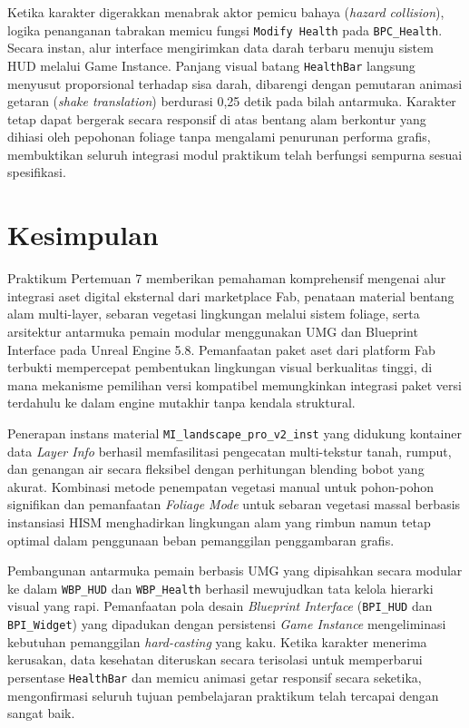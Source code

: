 \documentclass[a4paper,oneside,12pt]{report}
\begin{document}
Ketika karakter digerakkan menabrak aktor pemicu bahaya (\textit{hazard collision}), logika penanganan tabrakan memicu fungsi \texttt{Modify Health} pada \texttt{BPC\_Health}. Secara instan, alur interface mengirimkan data darah terbaru menuju sistem HUD melalui Game Instance. Panjang visual batang \texttt{HealthBar} langsung menyusut proporsional terhadap sisa darah, dibarengi dengan pemutaran animasi getaran (\textit{shake translation}) berdurasi 0,25 detik pada bilah antarmuka. Karakter tetap dapat bergerak secara responsif di atas bentang alam berkontur yang dihiasi oleh pepohonan foliage tanpa mengalami penurunan performa grafis, membuktikan seluruh integrasi modul praktikum telah berfungsi sempurna sesuai spesifikasi.

\clearpage

\chapter{Kesimpulan}
Praktikum Pertemuan 7 memberikan pemahaman komprehensif mengenai alur integrasi aset digital eksternal dari marketplace Fab, penataan material bentang alam multi-layer, sebaran vegetasi lingkungan melalui sistem foliage, serta arsitektur antarmuka pemain modular menggunakan UMG dan Blueprint Interface pada Unreal Engine 5.8. Pemanfaatan paket aset dari platform Fab terbukti mempercepat pembentukan lingkungan visual berkualitas tinggi, di mana mekanisme pemilihan versi kompatibel memungkinkan integrasi paket versi terdahulu ke dalam engine mutakhir tanpa kendala struktural.

Penerapan instans material \texttt{MI\_landscape\_pro\_v2\_inst} yang didukung kontainer data \textit{Layer Info} berhasil memfasilitasi pengecatan multi-tekstur tanah, rumput, dan genangan air secara fleksibel dengan perhitungan blending bobot yang akurat. Kombinasi metode penempatan vegetasi manual untuk pohon-pohon signifikan dan pemanfaatan \textit{Foliage Mode} untuk sebaran vegetasi massal berbasis instansiasi HISM menghadirkan lingkungan alam yang rimbun namun tetap optimal dalam penggunaan beban pemanggilan penggambaran grafis.

Pembangunan antarmuka pemain berbasis UMG yang dipisahkan secara modular ke dalam \texttt{WBP\_HUD} dan \texttt{WBP\_Health} berhasil mewujudkan tata kelola hierarki visual yang rapi. Pemanfaatan pola desain \textit{Blueprint Interface} (\texttt{BPI\_HUD} dan \texttt{BPI\_Widget}) yang dipadukan dengan persistensi \textit{Game Instance} mengeliminasi kebutuhan pemanggilan \textit{hard-casting} yang kaku. Ketika karakter menerima kerusakan, data kesehatan diteruskan secara terisolasi untuk memperbarui persentase \texttt{HealthBar} dan memicu animasi getar responsif secara seketika, mengonfirmasi seluruh tujuan pembelajaran praktikum telah tercapai dengan sangat baik.
\end{document}
